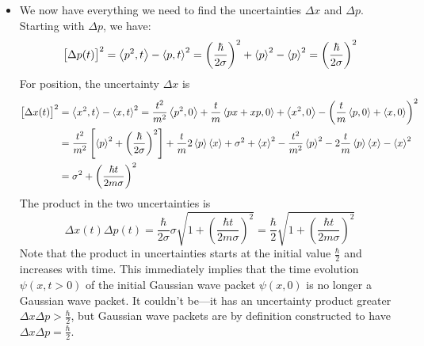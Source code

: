 \documentclass[11pt, a4paper]{article}
\begin{document}
\begin{itemize}
	\item We now have everything we need to find the uncertainties $ \Delta x $ and $ \Delta p $. Starting with $ \Delta p $, we have:
	\begin{equation*}
		\big[\Delta p(t)\big]^{2} = \ev{p^{2}, t} - \ev{p, t}^{2} =  \left(\frac{\hbar}{2\sigma}\right)^{2} + \ev{p}^{2} - \ev{p}^{2} = \left(\frac{\hbar}{2\sigma}\right)^{2}
	\end{equation*}
	For position, the uncertainty $ \Delta x $ is
	\begin{align*}
		\big[\Delta x(t)\big]^{2} &= \ev{x^{2}, t} - \ev{x, t}^{2} = \frac{t^{2}}{m^{2}}\ev{p^{2}, 0} + \frac{t}{m} \ev{px + xp, 0} + \ev{x^{2}, 0} - \left( \frac{t}{m} \ev{p, 0} + \ev{x, 0} \right)^{2}\\
		&=\frac{t^{2}}{m^{2}}\left[\ev{p}^{2} + \left(\frac{\hbar}{2\sigma}\right)^{2}\right] + \frac{t}{m}2\ev{p}\ev{x} + \sigma^{2} + \ev{x}^{2} - \frac{t^{2}}{m^{2}}\ev{p}^{2} - 2\frac{t}{m}\ev{p}\ev{x} - \ev{x}^{2}\\
		&= \sigma^{2} + \left(\frac{\hbar t}{2m\sigma}\right)^{2}
	\end{align*}
	The product in the two uncertainties is 
	\begin{equation*}
		\Delta x(t) \Delta p(t) = \frac{\hbar}{2\sigma} \sigma \sqrt{1 + \left(\frac{\hbar t}{2m\sigma}\right)^{2}} = \frac{\hbar}{2}\sqrt{1 + \left(\frac{\hbar t}{2m\sigma}\right)^{2}}
	\end{equation*}
	Note that the product in uncertainties starts at the initial value $ \frac{\hbar}{2} $ and increases with time. This immediately implies that the time evolution $ \psi(x, t > 0) $ of the initial Gaussian wave packet $ \psi(x, 0) $ is no longer a Gaussian wave packet. It couldn't be---it has an uncertainty product greater $ \Delta x \Delta p > \frac{\hbar}{2} $, but Gaussian wave packets are by definition constructed to have $ \Delta x \Delta p = \frac{\hbar}{2} $. 
\end{itemize}
\end{document}
